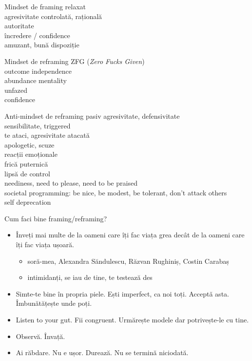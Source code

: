 \documentclass{simple}
\begin{document}
\begin{frame}{Mindset de framing}
  \pause
  relaxat \\
  \pause
  agresivitate controlată, rațională \\
  \pause
  autoritate \\
  \pause
  încredere / confidence \\
  \pause
  amuzant, bună dispoziție
\end{frame}

\begin{frame}{Mindset de reframing}
  \pause
  ZFG (\textit{Zero Fucks Given}) \\
  \pause
  outcome independence \\
  \pause
  abundance mentality \\
  \pause
  unfazed \\
  \pause
  confidence
\end{frame}

\begin{frame}{Anti-mindset de reframing}
  \pause pasiv agresivitate, defensivitate \\
  \pause sensibilitate, triggered \\
  \pause te ataci, agresivitate atacată \\
  \pause apologetic, scuze \\
  \pause reacții emoționale \\
  \pause frică puternică \\
  \pause lipsă de control \\
  \pause neediness, need to please, need to be praised \\
  \pause societal programming: be nice, be modest, be tolerant, don't attack others \\
  \pause self deprecation
\end{frame}

\begin{frame}{Cum faci bine framing/reframing?}
  \begin{itemize}
    \pause
    \item Înveți mai multe de la oameni care îți fac viața grea decât de la oameni care îți fac viața ușoară.
      \begin{itemize}
        \pause
        \item soră-mea, Alexandra Săndulescu, Răzvan Rughiniș, Costin Carabaș
        \pause
        \item intimidanți, se iau de tine, te testează des
      \end{itemize}
    \pause
    \item Simte-te bine în propria piele. Ești imperfect, ca noi toți. Acceptă asta. Îmbunătățește unde poți.
    \pause
    \item Listen to your gut. Fii congruent. Urmărește modele dar potrivește-le cu tine.
    \pause
    \item Observă. Învață.
    \pause
    \item Ai răbdare. Nu e ușor. Durează. Nu se termină niciodată.
  \end{itemize}
\end{frame}
\end{document}
